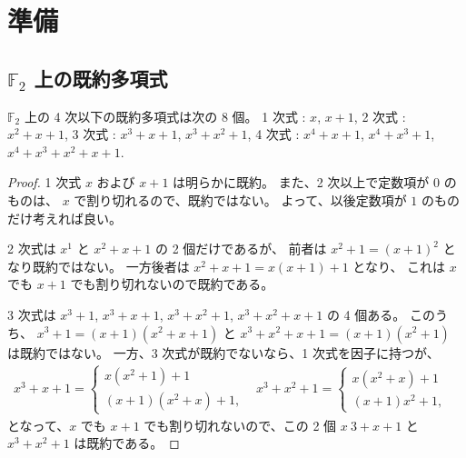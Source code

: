 
\section{準備}

\subsection{$\mathbb{F}_2$ 上の既約多項式}

\begin{proposition}
$\mathbb{F}_2$ 上の 4 次以下の既約多項式は次の 8 個。
1 次式 : $x$, $x+1$,
2 次式 : $x^2+x+1$,
3 次式 : $x^3+x+1$, $x^3+x^2+1$,
4 次式 : $x^4+x+1$, $x^4+x^3+1$, $x^4+x^3+x^2+x+1$.
\end{proposition}

\begin{proof}
1 次式 $x$ および $x+1$ は明らかに既約。
また、2 次以上で定数項が $0$ のものは、
$x$ で割り切れるので、既約ではない。
よって、以後定数項が $1$ のものだけ考えれば良い。


2 次式は $x^1$ と $x^2+x+1$ の 2 個だけであるが、
前者は $x^2+1 = (x+1)^2$ となり既約ではない。
一方後者は $x^2+x+1 = x(x+1) + 1$ となり、
これは $x$ でも $x+1$ でも割り切れないので既約である。

3 次式は $x^3+1$, $x^3+x+1$, $x^3+x^2+1$, $x^3+x^2+x+1$ の 4 個ある。
このうち、
$x^3+1 = (x+1)(x^2+x+1)$ と
$x^3+x^2+x+1 = (x+1)(x^2+1)$ は既約ではない。
一方、3 次式が既約でないなら、1 次式を因子に持つが、
\begin{eqnarray}
x^3 + x + 1 =
\begin{cases}
x (x^2+1) + 1 & \\
(x+1) (x^2+x) + 1, &
\end{cases}
x^3 + x^2 + 1 =
\begin{cases}
x (x^2 + x) + 1 & \\
(x+1) x^2 + 1, &
\end{cases}
\end{eqnarray}
となって、$x$ でも $x+1$ でも割り切れないので、この 2 個
$x~3 + x + 1$ と $x^3 + x^2 + 1$ は既約である。


\end{proof}
